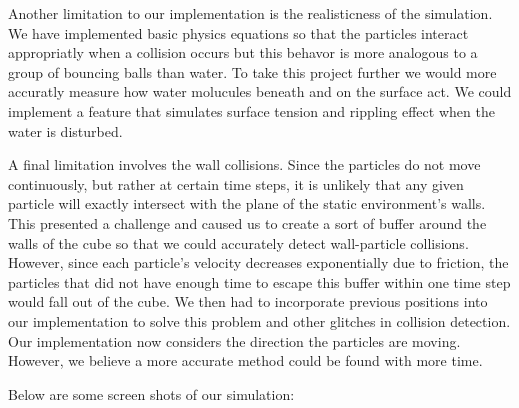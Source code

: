 Another limitation to our implementation is the realisticness of the simulation. We have implemented
basic physics equations so that the particles interact appropriatly when a collision occurs but this
behavor is more analogous to a group of bouncing balls than water. To take this project further we 
would more accuratly measure how water molucules beneath and on the surface act. We could implement 
a feature that simulates surface tension and rippling effect when the water is disturbed.

A final limitation involves the wall collisions.  Since the particles do not move continuously, but
rather at certain time steps, it is unlikely that any given particle will exactly intersect with the
plane of the static environment's walls.  This presented a challenge and caused us to create a sort 
of buffer around the walls of the cube so that we could accurately detect wall-particle collisions.
However, since each particle's velocity decreases exponentially due to friction, the particles that
did not have enough time to escape this buffer within one time step would fall out of the cube.  We
then had to incorporate previous positions into our implementation to solve this problem and other
glitches in collision detection. Our implementation now considers the direction the particles are
moving. However, we believe a more accurate method could be found with more time.

Below are some screen shots of our simulation:

